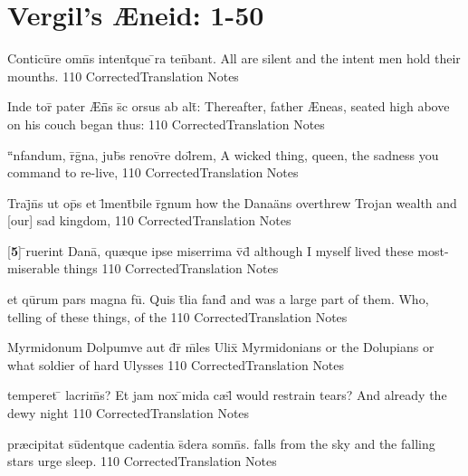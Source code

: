\section{Vergil's {\AE}neid: 1-50} %

\latline
  {Conticu\={}re omn\={}s intent\={\macron {\i}}que \={}ra ten\={}bant.}
  { All are silent and the intent men hold their mounths. }
  {110}
  { CorrectedTranslation }
  { Notes }


\latline
  {Inde tor\={} pater {\AE}n\={}\={}s s\={\macron {\i}}c orsus ab alt\={}:}
  { Thereafter, father {\AE}neas, seated high above on his couch began thus:  }
  {110}
  { CorrectedTranslation }
  { Notes }


\latline
  {``\={}nfandum, r\={}g\={\macron {\i}}na, jub\={}s renov\={}re dol\={}rem,}
  { A wicked thing, queen, the sadness you command to re-live,  }
  {110}
  { CorrectedTranslation }
  { Notes }


\latline
  {Traj\={}n\={}s ut op\={}s et l\={}ment\={}bile r\={}gnum}
  { how the Dana\"ans overthrew Trojan wealth and [our] sad kingdom,  }
  {110}
  { CorrectedTranslation }
  { Notes }


\latline
  {[\textbf{5}] \={}ruerint Dana\={\macron {\i}}, qu{\ae}que ipse miserrima v\={\macron {\i}}d\={\macron {\i}}}
  { although I myself lived these most-miserable things }
  {110}
  { CorrectedTranslation }
  { Notes }


\latline
  {et qu\={}rum pars magna fu\={\macron {\i}}.  Quis t\={}lia fand\={}}
  { and was a large part of them.  Who, telling of these things, of the  }
  {110}
  { CorrectedTranslation }
  { Notes }


\latline
  {Myrmidonum Dolpumve aut d\={}r\={\macron {\i}} m\={\macron {\i}}les Ulix\={\macron {\i}}}
  { Myrmidonians or the Dolupians or what soldier of hard Ulysses  }
  {110}
  { CorrectedTranslation }
  { Notes }


\latline
  {temperet \={} lacrim\={\macron {\i}}s?  Et jam nox \={}mida c{\ae}l\={}}
  { would restrain tears?  And already the dewy night }
  {110}
  { CorrectedTranslation }
  { Notes }


\latline
  {pr{\ae}cipitat su\={}dentque cadentia s\={\macron {\i}}dera somn\={}s.}
  { falls from the sky and the falling stars urge sleep. }
  {110}
  { CorrectedTranslation }
  { Notes }


